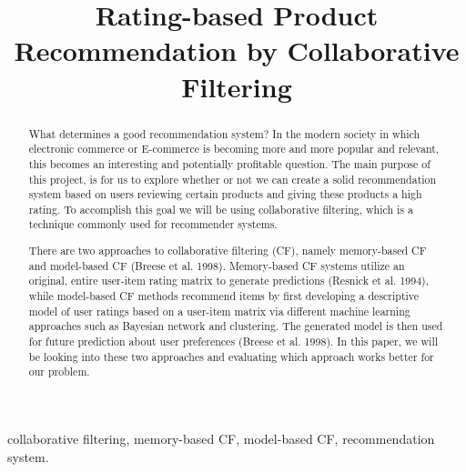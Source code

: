 \documentclass[conference]{IEEEtran}
\begin{document}
\title{Rating-based Product Recommendation by Collaborative Filtering}

\author{
\and
{}
\and
{}
}

\maketitle

\begin{abstract}

What determines a good recommendation system?  In the modern society in which electronic commerce or E-commerce is becoming more and more popular and relevant, this becomes an interesting and potentially profitable question.  The main purpose of this project, is for us to explore whether or not we can create a solid recommendation system based on users reviewing certain products and giving these products a high rating.  To accomplish this goal we will be using collaborative filtering, which is a technique commonly used for recommender systems.

There are two approaches to collaborative filtering (CF), namely memory-based CF and model-based CF (Breese et al. 1998). Memory-based CF systems utilize an original, entire user-item rating matrix to generate predictions (Resnick et al. 1994), while model-based CF methods recommend items by first developing a descriptive model of user ratings based on a user-item matrix via different machine learning approaches such as Bayesian network and clustering. The generated model is then used for future prediction about user preferences (Breese et al. 1998). In this paper, we will be looking into these two approaches and evaluating which approach works better for our problem. 

\end{abstract}

\begin{IEEEkeywords}
collaborative filtering, memory-based CF, model-based CF, recommendation system. 
\end{IEEEkeywords}
\end{document}
